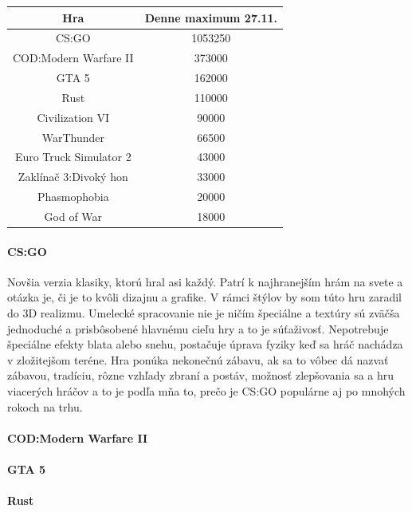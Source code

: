 \documentclass[10pt,twoside,slovak,a4paper]{article}
\begin{document}
\begin{center}
\begin{tabular}{ |c| c| }
\hline
 Hra & Denne maximum 27.11. \\
\hline
 CS:GO & 1053250 \\
\hline
 COD:Modern Warfare II & 373000 \\
\hline
 GTA 5 & 162000 \\
\hline
 Rust & 110000 \\
\hline
 Civilization VI & 90000 \\
\hline
 WarThunder & 66500 \\
\hline
 Euro Truck Simulator 2 & 43000 \\
\hline
 Zaklínač 3:Divoký hon & 33000 \\
\hline
 Phasmophobia & 20000 \\
\hline
 God of War & 18000 \\
\hline
\end{tabular}
\end{center}

\paragraph{CS:GO}
Novšia verzia klasiky, ktorú hral asi každý. Patrí k najhranejším hrám na svete a otázka je, či je to kvôli dizajnu a grafike. V rámci štýlov by som túto hru zaradil do 3D realizmu. Umelecké spracovanie nie je ničím špeciálne a textúry sú zväčša jednoduché a prisbôsobené hlavnému cieľu hry a to je súťaživosť. Nepotrebuje špeciálne efekty blata alebo snehu, postačuje úprava fyziky keď sa hráč nachádza v zložitejšom teréne. Hra ponúka nekonečnú zábavu, ak sa to vôbec dá nazvať zábavou, tradíciu, rôzne vzhľady zbraní a postáv, možnosť zlepšovania sa a hru viacerých hráčov a to je podľa mňa to, prečo je CS:GO populárne aj po mnohých rokoch na trhu.

\paragraph{COD:Modern Warfare II}

\paragraph{GTA 5}

\paragraph{Rust}
\end{document}
